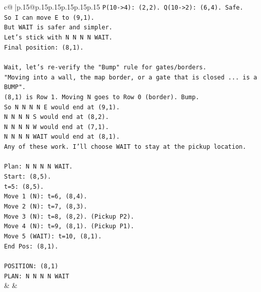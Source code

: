 \documentclass{article}
\begin{document}
{\begin{supertabular}{c@{$\;$}|p{.15\linewidth}@{}p{.15\linewidth}p{.15\linewidth}p{.15\linewidth}p{.15\linewidth}p{.15\linewidth}}
{{{\texttt{P(10{-}>4): (2,2). Q(10{-}>2): (6,4). Safe.} \\
\texttt{So I can move E to (9,1).} \\
\texttt{But WAIT is safer and simpler.} \\
\texttt{Let's stick with N N N N WAIT.} \\
\texttt{Final position: (8,1).} \\
\\ 
\texttt{Wait, let's re{-}verify the "Bump" rule for gates/borders.} \\
\texttt{"Moving into a wall, the map border, or a gate that is closed ... is a BUMP".} \\
\texttt{(8,1) is Row 1. Moving N goes to Row 0 (border). Bump.} \\
\texttt{So N N N N E would end at (9,1).} \\
\texttt{N N N N S would end at (8,2).} \\
\texttt{N N N N W would end at (7,1).} \\
\texttt{N N N N WAIT would end at (8,1).} \\
\texttt{Any of these work. I'll choose WAIT to stay at the pickup location.} \\
\\ 
\texttt{Plan: N N N N WAIT.} \\
\texttt{Start: (8,5).} \\
\texttt{t=5: (8,5).} \\
\texttt{Move 1 (N): t=6, (8,4).} \\
\texttt{Move 2 (N): t=7, (8,3).} \\
\texttt{Move 3 (N): t=8, (8,2). (Pickup P2).} \\
\texttt{Move 4 (N): t=9, (8,1). (Pickup P1).} \\
\texttt{Move 5 (WAIT): t=10, (8,1).} \\
\texttt{End Pos: (8,1).} \\
\\ 
\texttt{POSITION: (8,1)} \\
\texttt{PLAN: N N N N WAIT} \\
            }
        }
    }
    & & \\ \\


\end{supertabular}}
\end{document}
